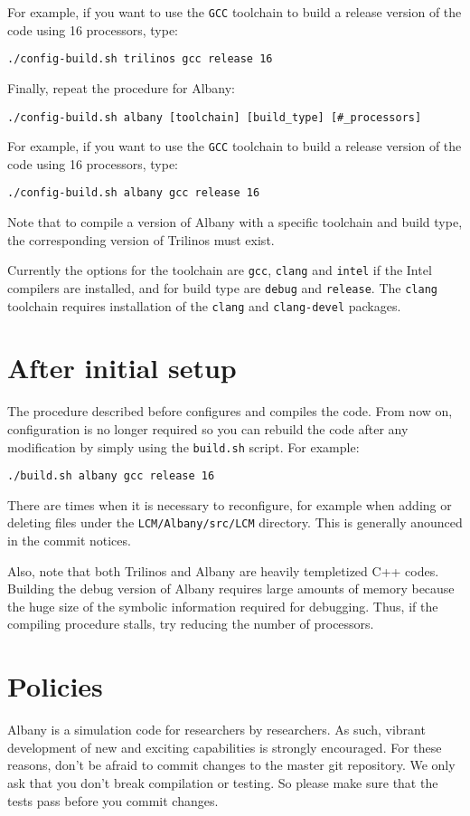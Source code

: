 \documentclass[10pt,a4paper]{article} \usepackage[utf8]{inputenc}
\begin{document}
For example, if you want to use the \verb+GCC+ toolchain to build a
release version of the code using 16 processors, type:
\begin{verbatim}
./config-build.sh trilinos gcc release 16
\end{verbatim}

Finally, repeat the procedure for Albany:
\begin{verbatim}
./config-build.sh albany [toolchain] [build_type] [#_processors]
\end{verbatim}

For example, if you want to use the \verb+GCC+ toolchain to build a
release version of the code using 16 processors, type:
\begin{verbatim}
./config-build.sh albany gcc release 16
\end{verbatim}

Note that to compile a version of Albany with a specific toolchain and
build type, the corresponding version of Trilinos must exist.

Currently the options for the toolchain are \verb+gcc+, \verb+clang+
and \verb+intel+ if the Intel compilers are installed, and for build
type are \verb+debug+ and \verb+release+. The \verb+clang+ toolchain
requires installation of the \verb+clang+ and \verb+clang-devel+
packages.

\section{After initial setup}
The procedure described before configures and compiles the code. From
now on, configuration is no longer required so you can rebuild the
code after any modification by simply using the \verb+build.sh+
script. For example:
\begin{verbatim}
./build.sh albany gcc release 16
\end{verbatim}

There are times when it is necessary to reconfigure, for example when
adding or deleting files under the \verb+LCM/Albany/src/LCM+
directory. This is generally anounced in the commit notices.

Also, note that both Trilinos and Albany are heavily templetized C++
codes. Building the debug version of Albany requires large amounts of
memory because the huge size of the symbolic information required for
debugging. Thus, if the compiling procedure stalls, try reducing the
number of processors.

\section{Policies}
Albany is a simulation code for researchers by researchers. As such,
vibrant development of new and exciting capabilities is strongly
encouraged. For these reasons, don't be afraid to commit changes to
the master git repository. We only ask that you don't break
compilation or testing. So please make sure that the tests pass before
you commit changes.
\end{document}
